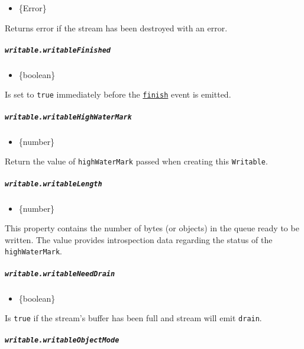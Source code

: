 \begin{itemize}
\tightlist
\item
  \{Error\}
\end{itemize}

Returns error if the stream has been destroyed with an error.

\subparagraph{\texorpdfstring{\texttt{writable.writableFinished}}{writable.writableFinished}}\label{writable.writablefinished}

\begin{itemize}
\tightlist
\item
  \{boolean\}
\end{itemize}

Is set to \texttt{true} immediately before the
\hyperref[event-finish]{\texttt{\textquotesingle{}finish\textquotesingle{}}}
event is emitted.

\subparagraph{\texorpdfstring{\texttt{writable.writableHighWaterMark}}{writable.writableHighWaterMark}}\label{writable.writablehighwatermark}

\begin{itemize}
\tightlist
\item
  \{number\}
\end{itemize}

Return the value of \texttt{highWaterMark} passed when creating this
\texttt{Writable}.

\subparagraph{\texorpdfstring{\texttt{writable.writableLength}}{writable.writableLength}}\label{writable.writablelength}

\begin{itemize}
\tightlist
\item
  \{number\}
\end{itemize}

This property contains the number of bytes (or objects) in the queue
ready to be written. The value provides introspection data regarding the
status of the \texttt{highWaterMark}.

\subparagraph{\texorpdfstring{\texttt{writable.writableNeedDrain}}{writable.writableNeedDrain}}\label{writable.writableneeddrain}

\begin{itemize}
\tightlist
\item
  \{boolean\}
\end{itemize}

Is \texttt{true} if the stream's buffer has been full and stream will
emit \texttt{\textquotesingle{}drain\textquotesingle{}}.

\subparagraph{\texorpdfstring{\texttt{writable.writableObjectMode}}{writable.writableObjectMode}}\label{writable.writableobjectmode}

